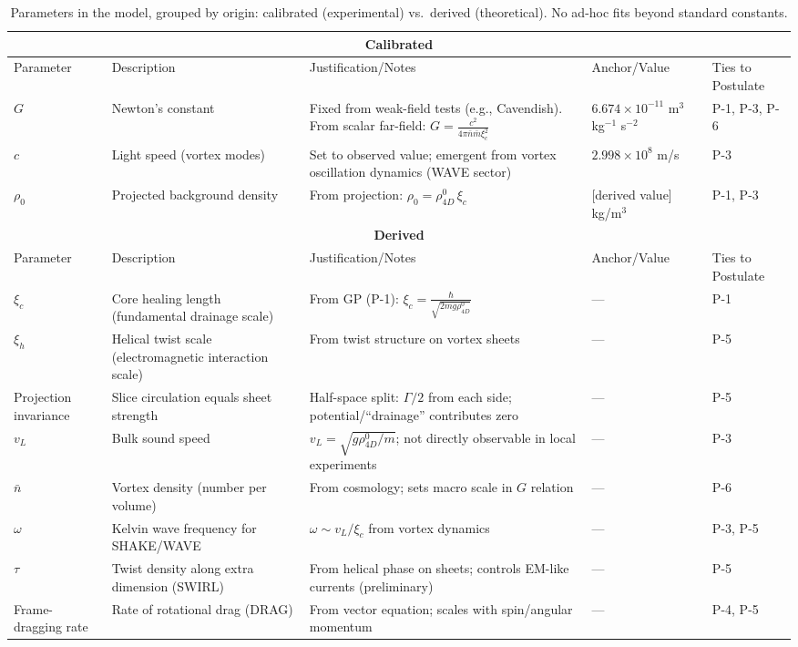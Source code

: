 \begin{table}[H]
\centering
\small
\begin{tabularx}{\linewidth}{|p{1.5cm}|p{3cm}|X|p{2cm}|p{2cm}|}
\hline
\multicolumn{5}{|c|}{\textbf{Calibrated}} \\
\hline
Parameter & Description & Justification/Notes & Anchor/Value & Ties to Postulate \\
\hline
$G$ & Newton's constant & Fixed from weak-field tests (e.g., Cavendish). From scalar far-field: $G = \frac{c^2}{4\pi \bar{n} \bar{m} \xi_c^2}$ & $6.674 \times 10^{-11}$ m$^3$ kg$^{-1}$ s$^{-2}$ & P-1, P-3, P-6 \\
\hline
$c$ & Light speed (vortex modes) & Set to observed value; emergent from vortex oscillation dynamics (WAVE sector) & $2.998 \times 10^8$ m/s & P-3 \\
\hline
$\rho_0$ & Projected background density & From projection: $\rho_0 = \rho_{4D}^0 \,\xi_c$ & [derived value] kg/m$^3$ & P-1, P-3 \\
\hline
\multicolumn{5}{|c|}{\textbf{Derived}} \\
\hline
Parameter & Description & Justification/Notes & Anchor/Value & Ties to Postulate \\
\hline
$\xi_c$ & Core healing length (fundamental drainage scale) & From GP (P-1): $\xi_c = \frac{\hbar}{\sqrt{2 m g \rho_{4D}^0}}$ & --- & P-1 \\
\hline
$\xi_h$ & Helical twist scale (electromagnetic interaction scale) & From twist structure on vortex sheets & --- & P-5 \\
\hline
Projection invariance & Slice circulation equals sheet strength & Half-space split: $\Gamma/2$ from each side; potential/“drainage” contributes zero & --- & P-5 \\
\hline
$v_L$ & Bulk sound speed & $v_L = \sqrt{g \rho_{4D}^0 / m}$; not directly observable in local experiments & --- & P-3 \\
\hline
$\bar{n}$ & Vortex density (number per volume) & From cosmology; sets macro scale in $G$ relation & --- & P-6 \\
\hline
$\omega$ & Kelvin wave frequency for SHAKE/WAVE & $\omega \sim v_L / \xi_c$ from vortex dynamics & --- & P-3, P-5 \\
\hline
$\tau$ & Twist density along extra dimension (SWIRL) & From helical phase on sheets; controls EM-like currents (preliminary) & --- & P-5 \\
\hline
Frame-dragging rate & Rate of rotational drag (DRAG) & From vector equation; scales with spin/angular momentum & --- & P-4, P-5 \\
\hline
\end{tabularx}
\caption{Parameters in the model, grouped by origin: calibrated (experimental) vs.\ derived (theoretical). No ad-hoc fits beyond standard constants.}
\label{tab:parameters}
\end{table}

